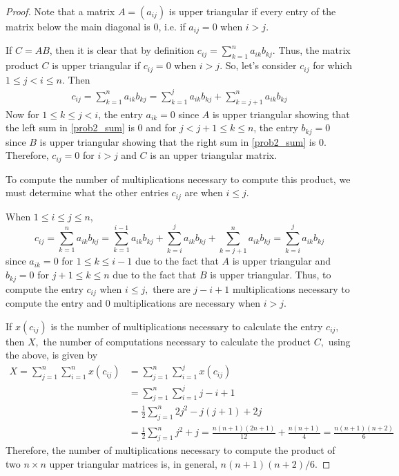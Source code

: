 \documentclass[12pt]{article}
\theoremstyle{definition}
\begin{document}
\begin{proof}
  Note that a matrix $A = (a_{ij})$ is upper triangular if every entry of the
  matrix below the main diagonal is $0$, i.e. if $a_{ij} = 0$ when $i > j$.

  If $C = AB$, then it is clear that by definition $c_{ij} = \sum_{k=1}^n a_{ik} b_{kj}$. Thus,
  the matrix product $C$ is upper triangular if $c_{ij} = 0$ when $i>j$. So, let's consider
  $c_{ij}$ for which $1 \leq j < i \leq n$. Then
  \begin{align}\label{prob2_sum}
    c_{ij} = \sum_{k=1}^n a_{ik}b_{kj} = \sum_{k=1}^j a_{ik}b_{kj} + \sum_{k=j+1}^n a_{ik}b_{kj}
  \end{align}
  Now for $1 \leq k \leq j < i$, the entry $a_{ik} = 0$ since $A$ is upper triangular
  showing that the left sum in \eqref{prob2_sum} is 0 and for $j < j + 1 \leq k \leq n$,
  the entry $b_{kj}=0$ since $B$ is upper triangular showing that the right sum in
  \eqref{prob2_sum} is 0. Therefore, $c_{ij} = 0$ for $i > j$ and $C$ is an upper triangular matrix.

  To compute the number of multiplications necessary to compute this product, we
  must determine what the other entries $c_{ij}$ are when $i \leq j$.

  When $1 \leq i \leq j \leq n$,
  $$c_{ij} = \sum_{k=1}^n a_{ik}b_{kj} = \sum_{k=1}^{i-1} a_{ik}b_{kj} + \sum_{k=i}^j a_{ik}b_{kj} + \sum_{k=j+1}^n a_{ik}b_{kj} = \sum_{k=i}^j a_{ik}b_{kj}$$
  since $a_{ik} = 0$ for $1 \leq k \leq i-1$ due to the fact that $A$ is upper triangular
  and $b_{kj} = 0$ for $j + 1 \leq k \leq n$ due to the fact that $B$ is upper triangular. Thus,
  to compute the entry $c_{ij}$ when $i \leq j,$ there are $j - i + 1$ multiplications necessary to compute the entry
  and 0 multiplications are necessary when $i > j$.

  If $x(c_{ij})$ is the number of multiplications necessary to calculate the entry $c_{ij},$ then $X,$ the number
  of computations necessary to calculate the product $C,$ using the above, is given by
  \begin{align*}
    X = \sum_{j=1} ^ n \sum_{i=1}^n x(c_{ij})
    &= \sum_{j=1} ^ n \sum_{i=1}^j x(c_{ij}) \\
    &= \sum_{j=1} ^ n \sum_{i=1}^j j - i + 1 \\
    &= \frac{1}{2}\sum_{j=1} ^ n 2j^2 - j(j+1) + 2j \\
    &= \frac{1}{2}\sum_{j=1} ^ n j^2 + j = \frac{n(n+1)(2n+1)}{12} + \frac{n(n+1)}{4} = \frac{n(n+1)(n+2)}{6}
  \end{align*}
  Therefore, the number of multiplications necessary to compute the product of
  two $n \times n$ upper triangular matrices is, in general, $n(n+1)(n+2)/6$.
\end{proof}
\end{document}
